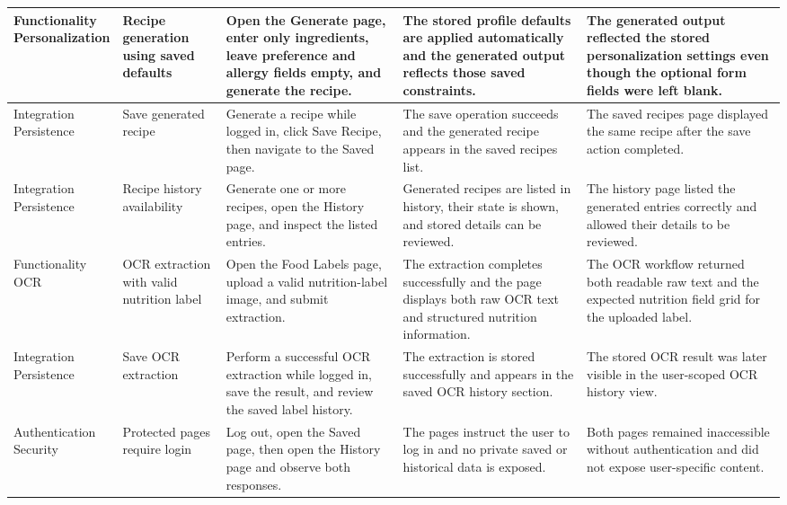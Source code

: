 \begin{table}[H]
\begin{tabularx}{\textwidth}{|p{2.2cm}|p{2.0cm}|>{\raggedright\arraybackslash}X|>{\raggedright\arraybackslash}X|>{\raggedright\arraybackslash}X|}
		\hline
		\makecell[tl]{Functionality\\Personalization} & Recipe generation using saved defaults & Open the Generate page, enter only ingredients, leave preference and allergy fields empty, and generate the recipe. & The stored profile defaults are applied automatically and the generated output reflects those saved constraints. & The generated output reflected the stored personalization settings even though the optional form fields were left blank. \\
		\hline
		\makecell[tl]{Integration\\Persistence} & Save generated recipe & Generate a recipe while logged in, click Save Recipe, then navigate to the Saved page. & The save operation succeeds and the generated recipe appears in the saved recipes list. & The saved recipes page displayed the same recipe after the save action completed. \\
		\hline
		\makecell[tl]{Integration\\Persistence} & Recipe history availability & Generate one or more recipes, open the History page, and inspect the listed entries. & Generated recipes are listed in history, their state is shown, and stored details can be reviewed. & The history page listed the generated entries correctly and allowed their details to be reviewed. \\
		\hline
		\makecell[tl]{Functionality\\OCR} & OCR extraction with valid nutrition label & Open the Food Labels page, upload a valid nutrition-label image, and submit extraction. & The extraction completes successfully and the page displays both raw OCR text and structured nutrition information. & The OCR workflow returned both readable raw text and the expected nutrition field grid for the uploaded label. \\
		\hline
		\makecell[tl]{Integration\\Persistence} & Save OCR extraction & Perform a successful OCR extraction while logged in, save the result, and review the saved label history. & The extraction is stored successfully and appears in the saved OCR history section. & The stored OCR result was later visible in the user-scoped OCR history view. \\
		\hline
		\makecell[tl]{Authentication\\Security} & Protected pages require login & Log out, open the Saved page, then open the History page and observe both responses. & The pages instruct the user to log in and no private saved or historical data is exposed. & Both pages remained inaccessible without authentication and did not expose user-specific content. \\

\end{tabularx}
\end{table}

